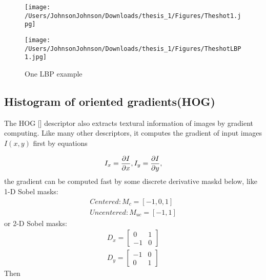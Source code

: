\begin{figure}[H]
\begin{minipage}[t]{0.5\linewidth}
\centering
\texttt{[image: /Users/JohnsonJohnson/Downloads/thesis\_1/Figures/Theshot1.jpg]}

\label{fig:side:a}
\end{minipage}%
\begin{minipage}[t]{0.5\linewidth}
\centering
\texttt{[image: /Users/JohnsonJohnson/Downloads/thesis\_1/Figures/TheshotLBP1.jpg]}

\label{fig:side:b}
\end{minipage}
\caption{One LBP example}
\end{figure}


\subsection{Histogram of oriented gradients(HOG)}
The HOG [] descriptor also extracts textural information of images by gradient computing. Like many other descriptors, it computes the gradient of input images $I(x, y)$ first by equations

\begin{equation}
I_x = \frac{\partial I}{\partial x},\\
I_y = \frac{\partial I}{\partial y},
\end{equation}
the gradient can be computed fast by some discrete derivative maskd below, like 1-D Sobel masks:
\begin{equation}
\begin{aligned}
Centered: M_{c} = [-1, 0, 1]\\
Uncentered: M_{uc} = [-1, 1]
\end{aligned}
\end{equation}
or 2-D Sobel masks:
\begin{equation}
\begin{aligned}
D_x = \left[ \begin{matrix}
0 & 1 \\
-1& 0
\end{matrix}
\right]\\
D_y = \left[ \begin{matrix}
-1 & 0 \\
0& 1
\end{matrix}
\right]
\end{aligned}
\end{equation}
Then 

